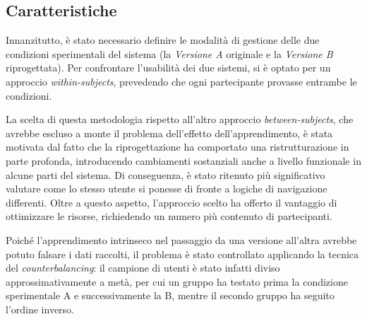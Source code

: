 \subsection{Caratteristiche}
Innanzitutto, è stato necessario definire le modalità di gestione delle due condizioni sperimentali del sistema (la \textit{Versione A} originale e la \textit{Versione B} riprogettata). Per confrontare l'usabilità dei due sistemi, si è optato per un approccio \textit{within-subjects}, prevedendo che ogni partecipante provasse entrambe le condizioni. 

La scelta di questa metodologia rispetto all'altro approccio \textit{between-subjects}, che avrebbe escluso a monte il problema dell'effetto dell'apprendimento, è stata motivata dal fatto che la riprogettazione ha comportato una ristrutturazione in parte profonda, introducendo cambiamenti sostanziali anche a livello funzionale in alcune parti del sistema. Di conseguenza, è stato ritenuto più significativo valutare come lo stesso utente si ponesse di fronte a logiche di navigazione differenti. Oltre a questo aspetto, l'approccio scelto ha offerto il vantaggio di ottimizzare le risorse, richiedendo un numero più contenuto di partecipanti. 

Poiché l'apprendimento intrinseco nel passaggio da una versione all'altra avrebbe potuto falsare i dati raccolti, il problema è stato controllato applicando la tecnica del \textit{counterbalancing}: il campione di utenti è stato infatti diviso approssimativamente a metà, per cui un gruppo ha testato prima la condizione sperimentale A e successivamente la B, mentre il secondo gruppo ha seguito l'ordine inverso. 